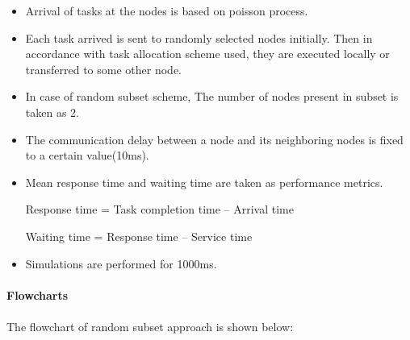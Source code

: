 \documentclass[12pt]{article}
\begin{document}
\begin{itemize}
\item Arrival of tasks at the nodes is based on poisson process.
\item Each task arrived is sent to randomly selected nodes initially. Then in accordance with task allocation scheme used, they are executed locally or transferred to some other node.
\item In case of random subset scheme, The number of nodes present in subset is taken as 2.
\item The communication delay between a node and its neighboring nodes is fixed to a certain value(10ms).
\item Mean response time and waiting time are taken as performance metrics.
\par Response time = Task completion time – Arrival time
\par Waiting time = Response time – Service time
\item Simulations are performed for 1000ms.
 
\end{itemize}
\clearpage
\paragraph{Flowcharts}
\paragraph{}
The flowchart of random subset approach is shown below:
\end{document}
